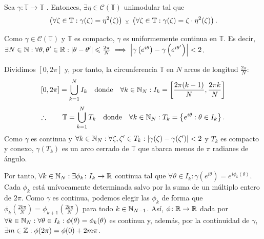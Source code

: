 \begin{lem}\label{lem:fn-continua-toro-imp-vueltas-par-impar}
    Sea $\gamma \colon \mathbb{T} \to \mathbb{T}$ . Entonces, $\exists \eta \in \mathcal{C}\left(\mathbb{T} \right)$ unimodular tal que
    \[
    \left(\forall \zeta \in \mathbb{T} : \gamma(\zeta) = \eta^2(\zeta) \right) \; _{\veebar} \; \left(\forall \zeta \in \mathbb{T} : \gamma(\zeta) = \zeta \cdot \eta^2(\zeta) \right).
    \] 
\end{lem}
\begin{dem}
    Como $\gamma \in \mathcal{C}\left(\mathbb{T} \right)$ y $\mathbb{T}$ es compacto, $\gamma$ es uniformemente continua en $\mathbb{T}$. Es decir, $\exists N \in \mathbb{N} : \forall \theta, \theta' \in \mathbb{R} : \left|\theta - \theta'\right| \leqslant \frac{2\pi}{N} \implies \left|\gamma \left(e^{i\theta} \right) - \gamma \left(e^{i\theta'} \right)\right| < 2$.
    
    Dividimos $[0, 2\pi]$ y, por tanto, la circunferencia $\mathbb{T}$ en $N$ arcos de longitud $\frac{2\pi}{N}$:
    \[
    \begin{aligned}
        [0, 2\pi] &= \bigcup_{k=1}^N I_k \quad \text{donde}\quad \forall k \in \N_N : I_k = \left[\frac{2\pi (k-1)}{N}, \frac{2\pi k}{N} \right] \\
    \end{aligned}
    \]
    \[
    \therefore \qquad \mathbb{T} = \bigcup_{k=1}^N T_k \quad \text{donde}\quad \forall k \in \mathbb{N}_N : T_k = \left\{ e^{i\theta} : \theta \in I_k \right\}.
    \]
    Como $\gamma$ es continua y $\forall k \in \mathbb{N}_N : \forall \zeta, \zeta' \in T_k : \left|\gamma(\zeta) - \gamma(\zeta')\right| < 2$ y $T_k$ es compacto y conexo, $\gamma(T_k)$ es un arco cerrado de $\mathbb{T}$ que abarca menos de $\pi$ radianes de ángulo.

    Por tanto, $\forall k \in \mathbb{N}_N : \exists \phi_k \colon I_k \to \mathbb{R}$ continua tal que $\forall \theta \in I_k : \gamma\left(e^{i\theta}\right) = e^{i\phi_k(\theta)}$. Cada $\phi_k$ está unívocamente determinada salvo por la suma de un múltiplo entero de $2\pi$. Como $\gamma$ es continua, podemos elegir las $\phi_k$ de forma que $\phi_k \left( \frac{2k\pi}{N} \right) = \phi_{k+1} \left( \frac{2k\pi}{N} \right)$ para todo $k \in \mathbb{N}_{N-1}$. Así, $\phi \colon \mathbb{R} \to \mathbb{R}$ dada por $\forall k \in \mathbb{N}_N : \forall \theta \in I_k : \phi(\theta) = \phi_k(\theta)$ es continua y, además, por la continuidad de $\gamma$, $\exists m \in \mathbb{Z} : \phi(2\pi) = \phi(0) + 2m\pi$.


\end{dem}
